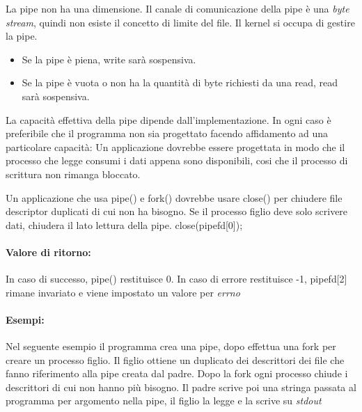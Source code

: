 \documentclass
[10pt,        %
 a4paper,     %
 onecolumn,   %
 fleqn,       %
 oneside,     %
 notitlepage, %
]{article}    %
\begin{document}


La pipe non ha una dimensione. Il canale di comunicazione della pipe è una \textit{byte stream}, quindi non esiste il concetto di limite del file. Il kernel si occupa di gestire la pipe.
\begin{itemize}
    \item Se la pipe è piena, write sarà sospensiva.
    \item Se la pipe è vuota o non ha la quantità di byte richiesti da una read, read sarà sospensiva.
\end{itemize}

La capacità effettiva della pipe dipende dall'implementazione. In ogni caso è preferibile che il programma non sia progettato facendo affidamento ad una particolare capacità: Un applicazione dovrebbe essere progettata in modo che il processo che legge consumi i dati appena sono disponibili, cosi che il processo di scrittura non rimanga bloccato.

Un applicazione che usa pipe() e fork() dovrebbe usare close() per chiudere file descriptor duplicati di cui non ha bisogno. Se il processo figlio deve solo scrivere dati, chiudera il lato lettura della pipe. close(pipefd[0]);



\paragraph{Valore di ritorno:}
In caso di successo, pipe() restituisce 0. In caso di errore restituisce -1, pipefd[2] rimane invariato e viene impostato un valore per \textit{errno}

\paragraph{Esempi:}
Nel seguente esempio il programma crea una pipe, dopo effettua una fork per creare un processo figlio. Il figlio ottiene un duplicato dei descrittori dei file che fanno riferimento alla pipe creata dal padre. Dopo la fork ogni processo chiude i descrittori di cui non hanno più bisogno. Il padre scrive poi una stringa passata al programma per argomento nella pipe, il figlio la legge e la scrive su \textit{stdout}

\end{document}
